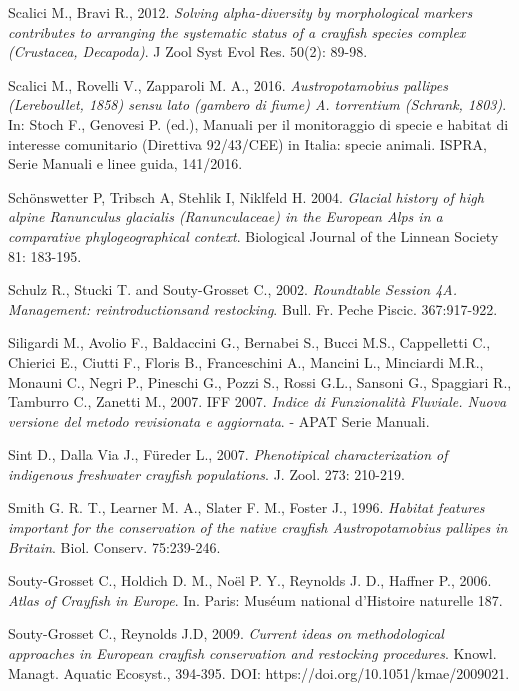 \documentclass[11pt,a4paper,italian,twoside,openany]{memoir}
\begin{document}
\begin{thebibliography}{9}
 Scalici M., Bravi R., 2012. \emph{Solving alpha-diversity by morphological markers contributes to arranging the systematic status of a crayfish species complex (Crustacea, Decapoda)}. J Zool Syst Evol Res. 50(2): 89-98.

 Scalici M., Rovelli V., Zapparoli M. A., 2016. \emph{Austropotamobius pallipes (Lereboullet, 1858) sensu lato (gambero di fiume) A. torrentium (Schrank, 1803)}. In: Stoch F., Genovesi P. (ed.), Manuali per il monitoraggio di specie e habitat di interesse comunitario (Direttiva 92/43/CEE) in Italia: specie animali. ISPRA, Serie Manuali e linee guida, 141/2016.

 Schönswetter P, Tribsch A, Stehlik I, Niklfeld H. 2004. \emph{Glacial history of high alpine Ranunculus glacialis (Ranunculaceae) in the European Alps in a comparative phylogeographical context}. Biological Journal of the Linnean Society 81: 183-195. 

 Schulz R., Stucki T. and Souty-Grosset C., 2002. \emph{Roundtable Session 4A. Management: reintroductionsand restocking}. Bull. Fr. Peche Piscic. 367:917-922.

 Siligardi M., Avolio F., Baldaccini G., Bernabei S., Bucci M.S., Cappelletti C., Chierici E., Ciutti F., Floris B., Franceschini A., Mancini L., Minciardi M.R., Monauni C., Negri P., Pineschi G., Pozzi S., Rossi G.L., Sansoni G., Spaggiari R., Tamburro C., Zanetti M., 2007. IFF 2007. \emph{Indice di Funzionalità Fluviale. Nuova versione del metodo revisionata e aggiornata}. - APAT Serie Manuali.

 Sint D., Dalla Via J., Füreder L., 2007. \emph{Phenotipical characterization of indigenous freshwater crayfish populations}. J. Zool. 273: 210-219.

 Smith G. R. T., Learner M. A., Slater F. M., Foster J., 1996. \emph{Habitat features important for the conservation of the native crayfish Austropotamobius pallipes in Britain}. Biol. Conserv. 75:239-246.

 Souty-Grosset C., Holdich D. M., Noël P. Y., Reynolds J. D., Haffner P., 2006. \emph{Atlas of Crayfish in Europe}. In. Paris: Muséum national d'Histoire naturelle 187.

 Souty-Grosset C., Reynolds J.D, 2009. \emph{Current ideas on methodological approaches in European crayfish conservation and restocking procedures}. Knowl. Managt. Aquatic Ecosyst., 394-395. DOI: https://doi.org/10.1051/kmae/2009021.


\end{thebibliography}
\end{document}
